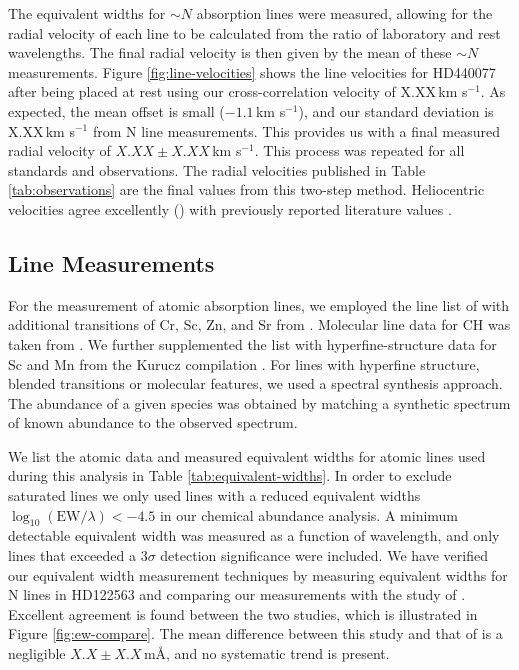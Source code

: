 \documentclass{emulateapj}
\begin{document}
The equivalent widths for $\sim{}N$ absorption lines were measured, allowing for the radial velocity of each line to be calculated from the ratio of laboratory and rest wavelengths. The final radial velocity is then given by the mean of these $\sim{}N$ measurements. Figure \ref{fig:line-velocities} shows the line velocities for HD440077 after  being placed at rest using our cross-correlation velocity of X.XX\,km s$^{-1}$. As expected, the mean offset is small ($-1.1$\,km s$^{-1}$), and our standard deviation is X.XX\,km s$^{-1}$ from N line measurements. This provides us with a final measured radial velocity of $X.XX \pm X.XX$\,km s$^{-1}$. This process was repeated for all standards and observations. The radial velocities published in Table \ref{tab:observations} are the final values from this two-step method. Heliocentric velocities agree excellently () with previously reported literature values \citep{Williams;wylie-de_boer;2012}.

\subsection{Line Measurements}
\label{sec:line-measurements}

For the measurement of atomic absorption lines, we employed the line list of \citet{Yong;et-al_2009} with additional transitions of Cr, Sc, Zn, and Sr from \citet{Frebel;et-al_2009}. Molecular line data for CH was taken from \citet{Plez;et-al_2008,Plez;et-al_2009}. We further supplemented the list with hyperfine-structure data for Sc and Mn  from the Kurucz compilation \citet{Kurucz;1998}. For lines with hyperfine structure, blended transitions or molecular features, we used a spectral synthesis approach. The abundance of a given species was obtained by matching a synthetic spectrum of known abundance to the observed spectrum.

We list the atomic data and measured equivalent widths for atomic lines used during this analysis in Table \ref{tab:equivalent-widths}. In order to exclude saturated lines we only used lines with a reduced equivalent widths $\log_{10}{(\mbox{EW}/\lambda)} < -4.5$ in our chemical abundance analysis. A minimum detectable equivalent width was measured as a function of wavelength, and only lines that exceeded a $3\sigma$ detection significance were included. We have verified our equivalent width measurement techniques by measuring equivalent widths for N lines in HD122563 and comparing our measurements with the study of \citet{Norris;et-al_2000}. Excellent agreement is found between the two studies, which is illustrated in Figure \ref{fig:ew-compare}. The mean difference between this study and that of \cite{Norris;et-al_2000} is a negligible $X.X \pm X.X$\,m\AA{}, and no systematic trend is present.
\end{document}
